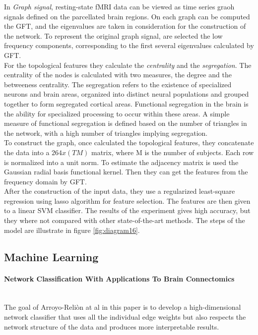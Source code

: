 In \textit{Graph signal}, resting-state fMRI data can be viewed as time series graoh signals defined on the parcellated brain regions. On each graph can be computed the GFT, and the eigenvalues are taken in consideration for the construction of the network. To represent the original graph signal, are selected the low frequency components, corresponding to the first several eigenvalues calculated by GFT. 
\\

For the topological features they calculate the \textit{centrality} and the \textit{segregation}. The centrality of the nodes is calculated with two measures, the degree and the betweeness centrality. The segregation refers to the existence of specialized neurons and brain areas, organized into distinct neural populations and grouped together to form segregated cortical areas. Functional segregation in the brain is the ability for specialized processing to occur within these areas. A simple measure of functional segregation is defined based on the number of triangles in the network, with a high number of triangles implying segregation.
\\

To construct the graph, once calculated the topological features, they concatenate the data into a $ 264 x (TM) $ matrix, where M is the number of subjects. Each row is normalized into a unit norm. To estimate the adjacency matrix is used the Gaussian radial basis functional kernel. Then they can get the features from the frequency domain by GFT. 
\\

After the construction of the input data, they use a regularized least-square regression using lasso algorithm for feature selection. The features are then given to a linear SVM classifier. The results of the experiment gives high accuracy, but they where not compared with other state-of-the-art methods. The steps of the model are illustrate in figure \ref{fig:diagram16}.

\subsection{Machine Learning}
\paragraph{Network Classification With Applications To Brain Connectomics}\
\label{par:3}
\\

The goal of Arroyo-Reliòn at al \cite{Arroyo_Reli_n_2019} in this paper is to develop a high-dimensional network classifier that uses all the individual edge weights but also respects the network structure of the data and produces more interpretable results. 
\\

